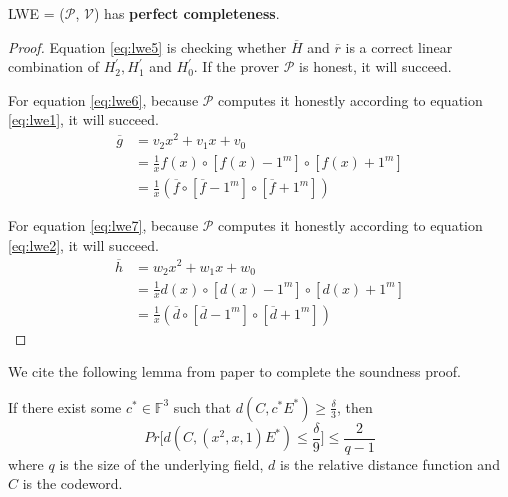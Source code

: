 \begin{lemma}
\label{lemma:lwepc}

LWE = ($\mathcal{P}$, $\mathcal{V}$) has \textbf{perfect completeness}.

\end{lemma}
\begin{proof}

Equation \ref{eq:lwe5} is checking whether $\overline{H}$ and $\overline{r}$ is a correct linear combination of $H_2^\prime, H_1^\prime$ and $H_0^\prime$. If the prover $\mathcal{P}$ is honest, it will succeed.


For equation \ref{eq:lwe6}, because $\mathcal{P}$ computes it honestly according to equation \ref{eq:lwe1}, it will succeed.
\begin{align*}
    \overline{g} 
    &= v_2x^2 + v_1x + v_0 \\
    &= \frac{1}{x} f(x) \circ [f(x) - 1^m] \circ [f(x) + 1^m] \\
    &= \frac{1}{x} (\overline{f} \circ [\overline{f} - 1^m] \circ [\overline{f} + 1^m]) 
\end{align*}

For equation \ref{eq:lwe7}, because $\mathcal{P}$ computes it honestly according to equation \ref{eq:lwe2}, it will succeed.
\begin{align*}
    \overline{h} 
    &= w_2x^2 + w_1x + w_0 \\
    &= \frac{1}{x} d(x) \circ [d(x) - 1^m] \circ [d(x) + 1^m] \\
    &= \frac{1}{x} (\overline{d} \circ [\overline{d} - 1^m] \circ [\overline{d} + 1^m]) 
\end{align*}

\end{proof}

We cite the following lemma from paper \cite{lwe} to complete the soundness proof.

\begin{lemma}
\label{lemma:lweseproof}

If there exist some $c^* \in \mathbb{F}^3$ such that $d(C, c^*E^*) \ge \frac{\delta}{3}$, then
$$
    Pr\biggl[ d(C, (x^2, x, 1)E^*) \le \frac{\delta}{9} \biggr] \le \frac{2}{q-1}
$$
where $q$ is the size of the underlying field, $d$ is the relative distance function and $C$ is the codeword.

\end{lemma}

